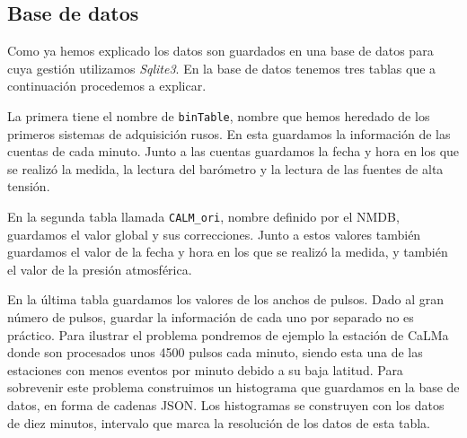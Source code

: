         \subsection{Base de datos}
            Como ya hemos explicado los datos son guardados en una base de
            datos para cuya gestión utilizamos \emph{Sqlite3}. En la base de
            datos tenemos tres tablas que a continuación procedemos a explicar.
                \par
            La primera tiene el nombre de \texttt{binTable}, nombre que hemos
            heredado de los primeros sistemas de adquisición rusos. En esta
            guardamos la información de las cuentas de cada minuto. Junto a las
            cuentas guardamos la fecha y hora en los que se realizó la medida,
            la lectura del barómetro y la lectura de las fuentes de alta
            tensión.
                \par 
            En la segunda tabla llamada \texttt{CALM\_ori}, nombre definido por
            el NMDB, guardamos el valor global y sus correcciones. Junto a
            estos valores también guardamos el valor de la fecha y hora en los
            que se realizó la medida, y también el valor de la presión
            atmosférica.
                \par
            En la última tabla guardamos los valores de los anchos de pulsos.
            Dado al gran número de pulsos, guardar la información de cada uno
            por separado no es práctico. Para ilustrar el problema pondremos de
            ejemplo la estación de CaLMa donde son procesados unos 4500 pulsos
            cada minuto, siendo esta una de las estaciones con menos eventos
            por minuto debido a su baja latitud. Para sobrevenir este problema
            construimos un histograma que guardamos en la base de datos, en
            forma de cadenas JSON\cite{JSON}. Los histogramas se construyen con
            los datos de diez minutos, intervalo que marca la resolución de los
            datos de esta tabla.

